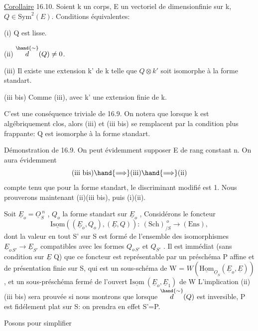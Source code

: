 \uline{Corollaire} 16.10. Soient k un corps, E un vectoriel de dimensionfinie
sur k, $Q \in \mathrm{Sym}^2(E)$. Conditions équivalentes:

(i) Q est lisse.

(ii) $\overset{\hand{\sim}}{d}(Q) \neq 0$.

(iii) Il existe une extension  k' de k telle que $Q\otimes k'$ soit
isomorphe à la forme standart.

(iii bis) Comme (iii), avec k' une extension finie de k.

C'est une conséquence triviale de 16.9. On notera que lorsque k est
algébriquement clos, alors (iii) et (iii bis) se remplacent par la
condition plus frappante: Q est isomorphe à la forme standart.

Démonstration de 16.9. On  peut évidemment
supposer E de rang constant n. On aura évidemment
\[ \text{(iii bis)} \hand{\Longrightarrow} \text{(iii)} \hand{\Longrightarrow} \text{(ii)} \]
compte tenu que pour la forme standart, le discriminant modifié est 1.
Nous prouverons maintenant (ii)\hand{$\Longrightarrow$}(iii bis), puis (i)\hand{$\Longleftrightarrow$}(ii).

Soit $\underline{E}_o = \underline{O}_S^{\ n}$ , $Q_o$ la forme standart sur $\underline{E}_o$ , Considérons le
foncteur
\[ \underline{\mathrm{Isom}}( (\underline{E}_o,Q_o),(\underline{E},Q)) :\ (\mathrm{Sch})_{/S}^{\ o} \longrightarrow (\mathrm{Ens}) , \]
dont la valeur en tout S' sur S est formé de l'ensemble des isomorphismes
$\underline{E}_{o\,S'} \to \underline{E}_{S'}$ compatibles avec les formes $Q_{o\,S'}$ et $Q_{S'}$ . Il est immédiat
(sans condition sur $\underline{E}$  Q) que ce foncteur est représentable par un préschéma
P affine et de présentation finie sur S, qui est un sous-schéma de W =
$W(\underline{\mathrm{Hom}}_{\underline{O}_S}(\underline{E}_o,\underline{E}))$ , et un sous-préschéma fermé de  l'ouvert
$\underline{\mathrm{Isom}}\ (\underline{E}_o,\underline{E}_1)$ de W \unsure{/} L'implication (ii)\hand{$\Longrightarrow$}(iii bis) sera prouvée si
nous montrons que lorsque $\overset{\hand{\sim}}{d}(Q)$ est inversible, P est fidélement plat
sur S: on prendra en effet S'=P.

Posons pour simplifier 

